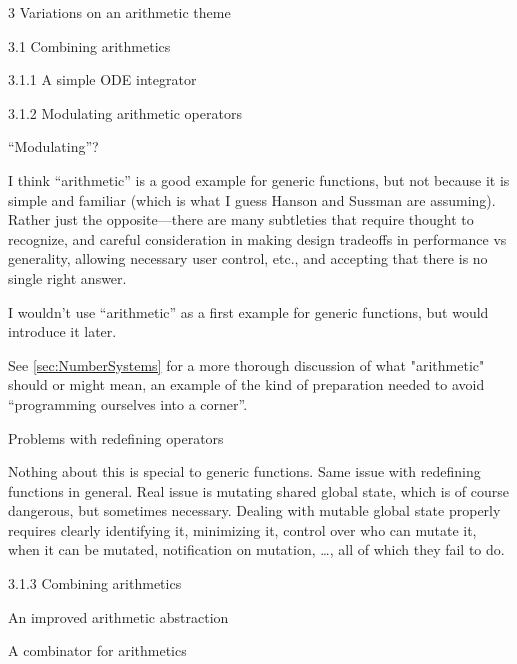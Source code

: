 \documentclass[12pt]{PalisadesLakesBook}
\begin{document}
\begin{plSection}{3 Variations on an arithmetic theme}
\begin{plSection}{3.1 Combining arithmetics}
\begin{plSection}{3.1.1 A simple ODE integrator}
\end{plSection}%
\begin{plSection}{3.1.2 Modulating arithmetic operators}

``Modulating''?

I think ``arithmetic'' is a good example for generic functions,
but not because it is simple and familiar
(which is what I guess Hanson and Sussman are assuming).
Rather just the opposite---there are many subtleties
that require thought to recognize,
and careful consideration in making design tradeoffs
in performance vs generality, allowing necessary user control,
etc.,
and accepting that there is no single right answer.

I wouldn't use ``arithmetic'' as a first example for
generic functions, but would introduce it later.

See \cref{sec:NumberSystems} 
for a more thorough discussion 
of what "arithmetic" should or might mean,
an example of the kind of preparation needed 
to avoid ``programming ourselves into a corner''.

\begin{plSection}{Problems with redefining operators}

Nothing about this is special to generic functions.
Same issue with redefining functions in general.
Real issue is mutating shared global state,
which is of course dangerous, but sometimes necessary.
Dealing with mutable global state properly requires
clearly identifying it, minimizing it,
control over who can mutate it,
when it can be mutated,
notification on mutation, {\ldots},
all of which they fail to do.

\end{plSection}%
\end{plSection}%
\begin{plSection}{3.1.3 Combining arithmetics}
\begin{plSection}{An improved arithmetic abstraction}
\end{plSection}%
\begin{plSection}{A combinator for arithmetics}


\end{plSection}
\end{plSection}
\end{plSection}
\end{plSection}
\end{document}

